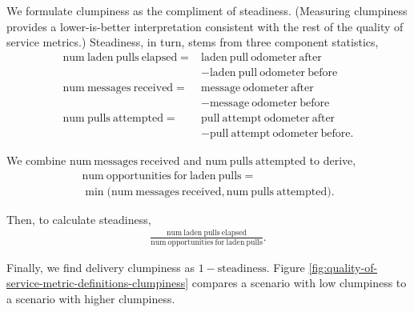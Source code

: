 We formulate clumpiness as the compliment of steadiness.
(Measuring clumpiness provides a lower-is-better interpretation consistent with the rest of the quality of service metrics.)
Steadiness, in turn, stems from three component statistics,
\begin{align*}
\mathrm{num\ laden\ pulls\ elapsed} =& \mathrm{laden\ pull\ odometer\ after} \\
  &- \mathrm{laden\ pull\ odometer\ before} \\
\mathrm{num\ messages\ received} =& \mathrm{message\ odometer\ after} \\
  &- \mathrm{message\ odometer\ before} \\
\mathrm{num\ pulls\ attempted} =& \mathrm{pull\ attempt\ odometer\ after} \\
  &- \mathrm{pull\ attempt\ odometer\ before}
.
\end{align*}

We combine $\mathrm{num\ messages\ received}$ and $\mathrm{num\ pulls\ attempted}$ to derive,
\begin{align*}
  \mathrm{num\ opportunities\ for\ laden\ pulls} = \\
   \min\Big(\mathrm{num\ messages\ received}, \mathrm{num\ pulls\ attempted}\Big).
\end{align*}

Then, to calculate steadiness,
\begin{align*}
  \frac{
    \mathrm{num\ laden\ pulls\ elapsed}
  }{
    \mathrm{num\ opportunities\ for\ laden\ pulls}
  }.
\end{align*}

Finally, we find delivery clumpiness as $1 - \mathrm{steadiness}$.
Figure \ref{fig:quality-of-service-metric-definitions-clumpiness} compares a scenario with low clumpiness to a scenario with higher clumpiness.
